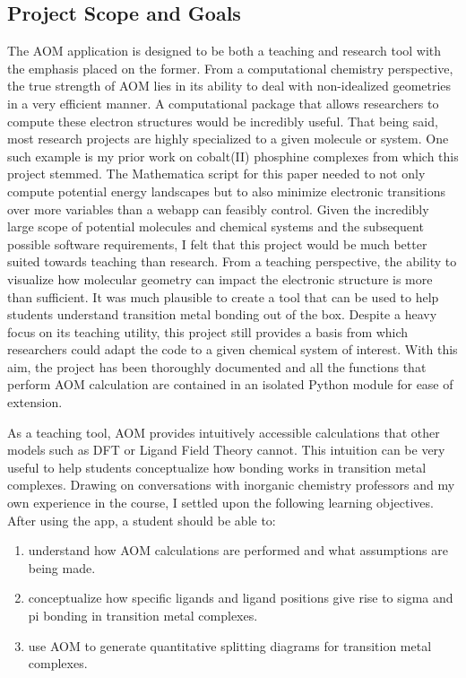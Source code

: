 \documentclass[10pt,twocolumn]{article}
\begin{document}
\subsection{Project Scope and Goals}
The AOM application is designed to be both a teaching and research tool with the emphasis placed on the former. From a computational chemistry perspective, the true strength of AOM lies in its ability to deal with non-idealized geometries in a very efficient manner. A computational package that allows researchers to compute these electron structures would be incredibly useful. That being said, most research projects are highly specialized to a given molecule or system. One such example is my prior work on cobalt(II) phosphine complexes from which this project stemmed. The Mathematica script for this paper needed to not only compute potential energy landscapes but to also minimize electronic transitions over more variables than a webapp can feasibly control. Given the incredibly large scope of potential molecules and chemical systems and the subsequent possible software requirements, I felt that this project would be much better suited towards teaching than research. From a teaching perspective, the ability to visualize how molecular geometry can impact the electronic structure is more than sufficient. It was much plausible to create a tool that can be used to help students understand transition metal bonding out of the box. Despite a heavy focus on its teaching utility, this project still provides a basis from which researchers could adapt the code to a given chemical system of interest. With this aim, the project has been thoroughly documented and all the functions that perform AOM calculation are contained in an isolated Python module for ease of extension.

As a teaching tool, AOM provides intuitively accessible calculations that other models such as DFT or Ligand Field Theory cannot. This intuition can be very useful to help students conceptualize how bonding works in transition metal complexes. Drawing on conversations with inorganic chemistry professors and my own experience in the course, I settled upon the following learning objectives. After using the app, a student should be able to:
\begin{enumerate}
	\item understand how AOM calculations are performed and what assumptions are being made.
	\item conceptualize how specific ligands and ligand positions give rise to sigma and pi bonding in transition metal complexes.
	\item use AOM to generate quantitative splitting diagrams for transition metal complexes.
\end{enumerate}
\end{document}
